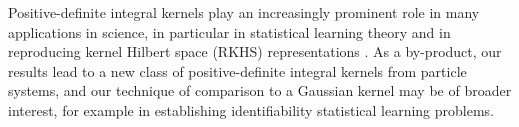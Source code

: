 \documentclass[]{elsarticle}
\newcommand{\mbf}[1]{\boldsymbol{#1}}
\newcommand{\br}{\mbf{r}}
\numberwithin{equation}{section}
\numberwithin{theorem}{section}
\begin{document}
Positive-definite integral kernels play an increasingly prominent role in many applications in science, in particular in statistical learning theory and in reproducing kernel Hilbert space (RKHS) representations \cite{cucker2002mathematical, smale2009geometry, Fasshauer11}. As a by-product, our results lead to a new class of positive-definite integral kernels from particle systems, and our technique of comparison to a Gaussian kernel may be of broader interest, for example in establishing identifiability statistical learning problems. 



 
\end{document}
